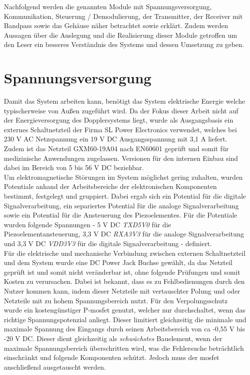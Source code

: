 Nachfolgend werden die genannten Module mit Spannungsversorgung, Kommunikation, Steuerung / Demodulierung, der Transmitter, der Receiver mit Bandpass sowie das Gehäuse näher betrachtet sowie erklärt. Zudem werden Aussagen über die Auslegung und die Realisierung dieser Module getroffen um den Leser ein besseres Verständnis des Systems und dessen Umsetzung zu geben.
\section{Spannungsversorgung}\label{sec:supply}
Damit das System arbeiten kann, benötigt das System elektrische Energie welche typischerweise von Außen zugeführt wird. Da der Fokus dieser Arbeit nicht auf der Energieversorgung des Dopplersystems liegt, wurde als Ausgangsbasis ein externes Schaltnetzteil der Firma SL Power Electronics verwendet, welches bei 230 V AC Netzspannung ein 19 V DC Ausgangsspannung mit 3,1 A liefert. Zudem ist das Netzteil GXM60-19A04 nach EN60601 geprüft und somit für medizinische Anwendungen zugelassen. Versionen für den internen Einbau sind dabei im Bereich von 5 bis 56 V DC beziehbar.\\%
Um elektromagnetische Störungen im System möglichst gering zuhalten, wurden Potentiale anhand der Arbeitsbereiche der elektronischen Komponenten bestimmt, festgelegt und gruppiert. Dabei ergab sich ein Potential für die digitale Signalverarbeitung, ein separiertes Potential für die analoge Signalverarbeitung sowie ein Potential für die Ansteuerung des Piezoelementes. Für die Potentiale wurden folgende Spannungen - 5 V DC \textit{TXD5V0} für die Piezoelementansteuerung, 3,3 V DC \textit{RXA3V3} für die analoge Signalverarbeitung und 3,3 V DC \textit{VDD3V3} für die digitale Signalverarbeitung - definiert.\\
Für die elektrische und mechanische Verbindung zwischen externen Schaltnetzteil und dem System wurde eine DC Power Jack Buchse gewählt, da das Netzteil geprüft ist und somit nicht veränderbar ist, ohne folgende Prüfungen und somit Kosten zu verursachen. Dabei ist bekannt, dass es zu Fehlbedienungen durch den Nutzer kommen kann, indem dieser Netzteile mit vertauschter Polung und oder Netzteile mit zu hohem Spannungsbereich nutzt. 
Für den Verpolungsschutz wurde ein kostengünstiger P-\ac{mosfet} genutzt, welcher nur durchschaltet, wenn das richtige Spannungspotenzial anliegt. Dieser limitiert gleichzeitig die minimale und maximale Spannung des Eingangs durch seinen Arbeitsbereich von \ac{ca} -0,55 V  bis -20 V DC. Dieser dient gleichzeitig als \textit{schwächstes} Bauelement, wenn der maximale Spannungsbereich überschritten wird, was die Fehlersuche beträchtlich einschränkt und folgende Komponenten schützt. Jedoch muss der \ac{mosfet} anschließend ausgetauscht werden.\\
